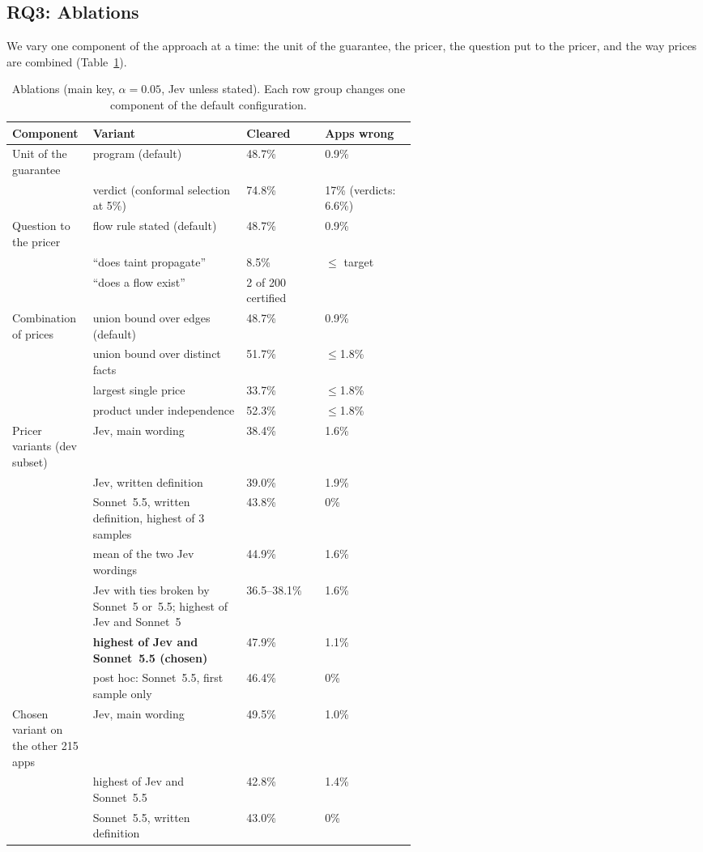\subsection{RQ3: Ablations}
\label{sec:rq3}

We vary one component of the approach at a time: the unit of the guarantee, the pricer, the question put to the pricer, and the way prices are combined (Table~\ref{tab:ablation}).

\begin{table}[t]
\caption{Ablations (main key, $\alpha=0.05$, Jev unless stated). Each row group changes one component of the default configuration.}
\label{tab:ablation}
\small
\begin{tabular}{@{}>{\raggedright\arraybackslash}p{0.2\linewidth}>{\raggedright\arraybackslash}p{0.38\linewidth}ll@{}}
\toprule
Component & Variant & Cleared & Apps wrong\\
\midrule
Unit of the guarantee & program (default) & 48.7\% & 0.9\%\\
 & verdict (conformal selection at 5\%) & 74.8\% & 17\% (verdicts: 6.6\%)\\
\midrule
Question to the pricer & flow rule stated (default) & 48.7\% & 0.9\%\\
 & ``does taint propagate'' & 8.5\% & $\le$ target\\
 & ``does a flow exist'' & 2 of 200 certified & \\
\midrule
Combination of prices & union bound over edges (default) & 48.7\% & 0.9\%\\
 & union bound over distinct facts & 51.7\% & $\le$1.8\%\\
 & largest single price & 33.7\% & $\le$1.8\%\\
 & product under independence & 52.3\% & $\le$1.8\%\\
\midrule
Pricer variants (dev subset) & Jev, main wording & 38.4\% & 1.6\%\\
 & Jev, written definition & 39.0\% & 1.9\%\\
 & Sonnet~5.5, written definition, highest of 3 samples & 43.8\% & 0\%\\
 & mean of the two Jev wordings & 44.9\% & 1.6\%\\
 & Jev with ties broken by Sonnet~5 or~5.5; highest of Jev and Sonnet~5 & 36.5--38.1\% & 1.6\%\\
 & \textbf{highest of Jev and Sonnet~5.5 (chosen)} & 47.9\% & 1.1\%\\
 & post hoc: Sonnet~5.5, first sample only & 46.4\% & 0\%\\
\midrule
Chosen variant on the other 215 apps & Jev, main wording & 49.5\% & 1.0\%\\
 & highest of Jev and Sonnet~5.5 & 42.8\% & 1.4\%\\
 & Sonnet~5.5, written definition & 43.0\% & 0\%\\
\bottomrule
\end{tabular}
\end{table}

